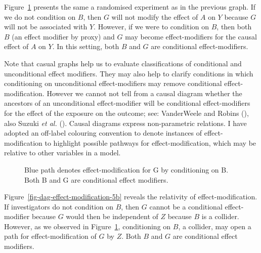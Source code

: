 \documentclass[
  singlecolumn]{article}
\begin{document}
Figure~\ref{fig-dag-effect-modification-5} presents the same a
randomised experiment as in the previous graph. If we do not condition
on \(B\), then \(G\) will not modify the effect of \(A\) on \(Y\)
because \(G\) will not be associated with \(Y\). However, if we were to
condition on \(B\), then both \(B\) (an effect modifier by proxy) and
\(G\) may become effect-modifiers for the causal effect of \(A\) on
\(Y\). In this setting, both \(B\) and \(G\) are conditional
effect-modifiers.

Note that casual graphs help us to evaluate classifications of
conditional and unconditional effect modifiers. They may also help to
clarify conditions in which conditioning on unconditional
effect-modifiers may remove conditional effect-modification. However we
cannot not tell from a causal diagram whether the ancestors of an
unconditional effect-modifier will be conditional effect-modifiers for
the effect of the exposure on the outcome; see: VanderWeele and Robins
(), also Suzuki \emph{et al.}
(). Causal diagrams express
non-parametric relations. I have adopted an off-label colouring
convention to denote instances of effect-modification to highlight
possible pathways for effect-modification, which may be relative to
other variables in a model.

\begin{figure}


\caption{\label{fig-dag-effect-modification-5}Blue path denotes
effect-modification for G by conditioning on B. Both B and G are
conditional effect modifiers.}

\end{figure}%

Figure~\ref{fig-dag-effect-modification-5b} reveals the relativity of
effect-modification. If investigators do not condition on \(B\), then
\(G\) cannot be a conditional effect-modifier because \(G\) would then
be independent of \(Z\) because \(B\) is a collider. However, as we
observed in Figure~\ref{fig-dag-effect-modification-5}, conditioning on
\(B\), a collider, may open a path for effect-modification of \(G\) by
\(Z\). Both \(B\) and \(G\) are conditional effect modifiers.
\end{document}
